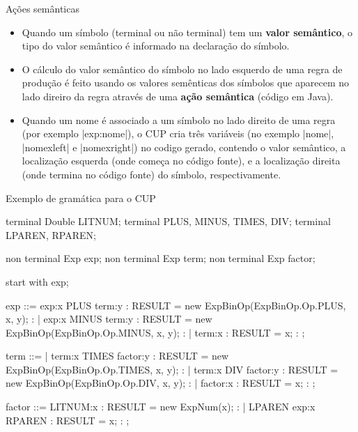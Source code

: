 \begin{frame}{Ações semânticas}
  \begin{itemize}
    \item Quando um símbolo (terminal ou não terminal) tem um
    \textbf{valor semântico}, o tipo do valor semântico é informado na
    declaração do símbolo.
    \item O cálculo do valor semântico do símbolo no lado esquerdo de
    uma regra de produção é feito usando os valores semênticas dos
    símbolos que aparecem no lado direiro da regra através de uma
    \textbf{ação semântica} (código em Java).
    \item Quando um \alert{nome} é associado a um símbolo no lado
    direito de uma regra (por exemplo \pyginline|exp:nome|), o CUP
    cria três variáveis (no exemplo \pyginline|nome|,
    \pyginline|nomexleft| e \pyginline|nomexright|) no codigo gerado,
    contendo o valor semântico, a localização esquerda (onde começa no
    código fonte), e a localização direita (onde termina no código
    fonte) do símbolo, respectivamente.
  \end{itemize}
\end{frame}


\begin{frame}{Exemplo de gramática para o CUP}
  \scriptsize
\begin{pygmented}[]
terminal Double LITNUM;
terminal        PLUS, MINUS, TIMES, DIV;
terminal        LPAREN, RPAREN;

non terminal Exp exp;
non terminal Exp term;
non terminal Exp factor;

start with exp;

exp ::=
  exp:x PLUS term:y      {: RESULT = new ExpBinOp(ExpBinOp.Op.PLUS, x, y);  :}
| exp:x MINUS term:y     {: RESULT = new ExpBinOp(ExpBinOp.Op.MINUS, x, y); :}
| term:x                 {: RESULT = x;                                     :}
;

term ::=
| term:x TIMES factor:y  {: RESULT = new ExpBinOp(ExpBinOp.Op.TIMES, x, y); :}
| term:x DIV factor:y    {: RESULT = new ExpBinOp(ExpBinOp.Op.DIV, x, y);   :}
| factor:x               {: RESULT = x;                                     :}
;

factor ::=
  LITNUM:x               {: RESULT = new ExpNum(x);                         :}
| LPAREN exp:x RPAREN    {: RESULT = x;                                     :}
;
\end{pygmented}
\end{frame}


